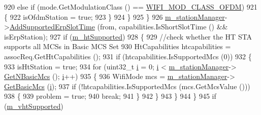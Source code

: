 \begin{DoxyCode}
920                       \textcolor{keywordflow}{else} \textcolor{keywordflow}{if} (mode.GetModulationClass () == \hyperlink{namespacens3_aa999e1221606a2b21b1eb33c2007c217a30a83a0318357c9611f09e6faadc8006}{WIFI\_MOD\_CLASS\_OFDM})
921                         \{
922                           isOfdmStation = \textcolor{keyword}{true};
923                         \}
924                     \}
925                 \}
926               \hyperlink{classns3_1_1RegularWifiMac_a76d1a5e27b64bfe36f24a55d1eea2775}{m\_stationManager}->\hyperlink{classns3_1_1WifiRemoteStationManager_ad6f363b975424a99e6190d04078408e5}{AddSupportedErpSlotTime} (from, 
      capabilities.IsShortSlotTime () && isErpStation);
927               \textcolor{keywordflow}{if} (\hyperlink{classns3_1_1RegularWifiMac_a8950c44b8cf2ad1f9274821cf88adc7b}{m\_htSupported})
928                 \{
929                   \textcolor{comment}{//check whether the HT STA supports all MCSs in Basic MCS Set}
930                   HtCapabilities htcapabilities = assocReq.GetHtCapabilities ();
931                   \textcolor{keywordflow}{if} (htcapabilities.IsSupportedMcs (0))
932                     \{
933                       isHtStation = \textcolor{keyword}{true};
934                       \textcolor{keywordflow}{for} (uint32\_t \hyperlink{bernuolliDistribution_8m_a6f6ccfcf58b31cb6412107d9d5281426}{i} = 0; \hyperlink{bernuolliDistribution_8m_a6f6ccfcf58b31cb6412107d9d5281426}{i} < \hyperlink{classns3_1_1RegularWifiMac_a76d1a5e27b64bfe36f24a55d1eea2775}{m\_stationManager}->
      \hyperlink{classns3_1_1WifiRemoteStationManager_a0a421b0b492b65ca21919258085db4dd}{GetNBasicMcs} (); \hyperlink{bernuolliDistribution_8m_a6f6ccfcf58b31cb6412107d9d5281426}{i}++)
935                         \{
936                           WifiMode mcs = \hyperlink{classns3_1_1RegularWifiMac_a76d1a5e27b64bfe36f24a55d1eea2775}{m\_stationManager}->
      \hyperlink{classns3_1_1WifiRemoteStationManager_ad879e69f9470219a53c87de067bf2f40}{GetBasicMcs} (\hyperlink{bernuolliDistribution_8m_a6f6ccfcf58b31cb6412107d9d5281426}{i});
937                           \textcolor{keywordflow}{if} (!htcapabilities.IsSupportedMcs (mcs.GetMcsValue ()))
938                             \{
939                               problem = \textcolor{keyword}{true};
940                               \textcolor{keywordflow}{break};
941                             \}
942                         \}
943                     \}
944                 \}
945               \textcolor{keywordflow}{if} (\hyperlink{classns3_1_1RegularWifiMac_a151f330fdeb3f83f9ec7cf07537f0e86}{m\_vhtSupported})

\end{DoxyCode}
